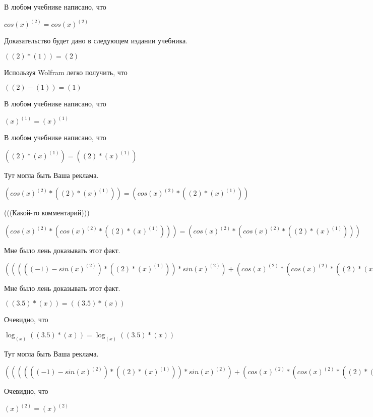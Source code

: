 \documentclass[12pt,a4paper,fleqn]{article}
\theoremstyle{definition}
\begin{document}
В любом учебнике написано, что

$cos{( x )}^{( 2 )} = cos{( x )}^{( 2 )}$

Доказательство будет дано в следующем издании учебника.

$(( 2 ) * ( 1 )) = ( 2 )$

Используя Wolfram легко получить, что

$(( 2 ) - ( 1 )) = ( 1 )$

В любом учебнике написано, что

${( x )}^{( 1 )} = {( x )}^{( 1 )}$

В любом учебнике написано, что

$(( 2 ) * {( x )}^{( 1 )}) = (( 2 ) * {( x )}^{( 1 )})$

Тут могла быть Ваша реклама.

$(cos{( x )}^{( 2 )} * (( 2 ) * {( x )}^{( 1 )})) = (cos{( x )}^{( 2 )} * (( 2 ) * {( x )}^{( 1 )}))$

(((Какой-то комментарий)))

$(cos{( x )}^{( 2 )} * (cos{( x )}^{( 2 )} * (( 2 ) * {( x )}^{( 1 )}))) = (cos{( x )}^{( 2 )} * (cos{( x )}^{( 2 )} * (( 2 ) * {( x )}^{( 1 )})))$

Мне было лень доказывать этот факт.

$((((( -1 ) - sin{( x )}^{( 2 )}) * (( 2 ) * {( x )}^{( 1 )})) * sin{( x )}^{( 2 )}) + (cos{( x )}^{( 2 )} * (cos{( x )}^{( 2 )} * (( 2 ) * {( x )}^{( 1 )})))) = ((((( -1 ) - sin{( x )}^{( 2 )}) * (( 2 ) * {( x )}^{( 1 )})) * sin{( x )}^{( 2 )}) + (cos{( x )}^{( 2 )} * (cos{( x )}^{( 2 )} * (( 2 ) * {( x )}^{( 1 )}))))$

Мне было лень доказывать этот факт.

$(( 3.5 ) * ( x )) = (( 3.5 ) * ( x ))$

Очевидно, что

$\log_{( x )}{(( 3.5 ) * ( x ))} = \log_{( x )}{(( 3.5 ) * ( x ))}$

Тут могла быть Ваша реклама.

$(((((( -1 ) - sin{( x )}^{( 2 )}) * (( 2 ) * {( x )}^{( 1 )})) * sin{( x )}^{( 2 )}) + (cos{( x )}^{( 2 )} * (cos{( x )}^{( 2 )} * (( 2 ) * {( x )}^{( 1 )})))) * \log_{( x )}{(( 3.5 ) * ( x ))}) = (((((( -1 ) - sin{( x )}^{( 2 )}) * (( 2 ) * {( x )}^{( 1 )})) * sin{( x )}^{( 2 )}) + (cos{( x )}^{( 2 )} * (cos{( x )}^{( 2 )} * (( 2 ) * {( x )}^{( 1 )})))) * \log_{( x )}{(( 3.5 ) * ( x ))})$

Очевидно, что

${( x )}^{( 2 )} = {( x )}^{( 2 )}$
\end{document}
